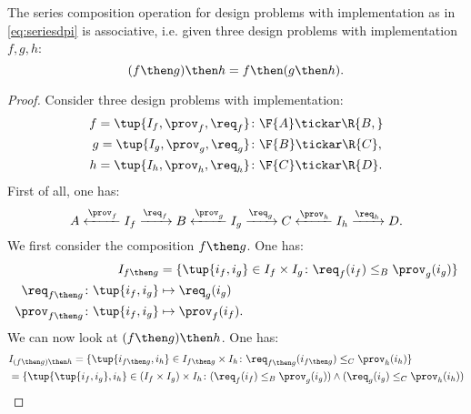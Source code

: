 \begin{lemma}
The series composition operation for design problems with implementation as in \cref{eq:seriesdpi} is associative, i.e. given three design problems with implementation $f,g,h$:
\begin{equation}
    (f\then g)\then h = f\then (g\then h).
\end{equation}
\end{lemma}
\begin{proof}
Consider three design problems with implementation:
\begin{equation}
    \begin{aligned}
    f=\tup{{I_f, \prov_f, \req_f} }&\colon \F{A} \tickar\R{B,}\\
    g=\tup{I_g, \prov_g, \req_g}&\colon \F{B} \tickar \R{C},\\
    h=\tup{I_h, \prov_h, \req_h}&\colon \F{C} \tickar \R{D}.
    \end{aligned}
\end{equation}
First of all, one has:
\begin{equation}
    A \xleftarrow{\prov_f} I_f \xrightarrow{\req_f} B
      \xleftarrow{\prov_g} I_g \xrightarrow{\req_g} C
      \xleftarrow{\prov_h} I_h \xrightarrow{\req_h} D.
\end{equation}
We first consider the composition $f\then g$. One has:
\begin{equation}
\begin{aligned}
I_{f\then g} &= \{
                \tup{i_f,i_g} \in I_f \times I_g \colon
                \req_f(i_f) \leq_{B} \prov_g(i_g)
            \}\\
        \req_{f\then g}  \colon  \tup{i_f,i_g} &\mapsto \req_g(i_g) \\
        \prov_{f\then g}  \colon  \tup{i_f,i_g} &\mapsto \prov_f(i_f).
\end{aligned}
\end{equation}
We can now look at $(f\then g)\then h$. One has:
\begin{equation}
\begin{aligned}
        &I_{(f\then g)\then h} = \{
                \tup{i_{f\then g},i_h} \in I_{f\then g} \times I_{h}\colon
                \req_{f\then g}(i_{f\then g}) \leq_{C} \prov_h(i_h)
            \}\\
        &=\{
                \tup{\tup{i_f, i_g},i_h} \in (I_f \times I_g) \times I_{h}\colon
                (\req_f(i_f) \leq_{B} \prov_g(i_g))
                \wedge
                (\req_g(i_g) \leq_{C} \prov_h(i_h))

\end{aligned}
\end{equation}
\end{proof}
